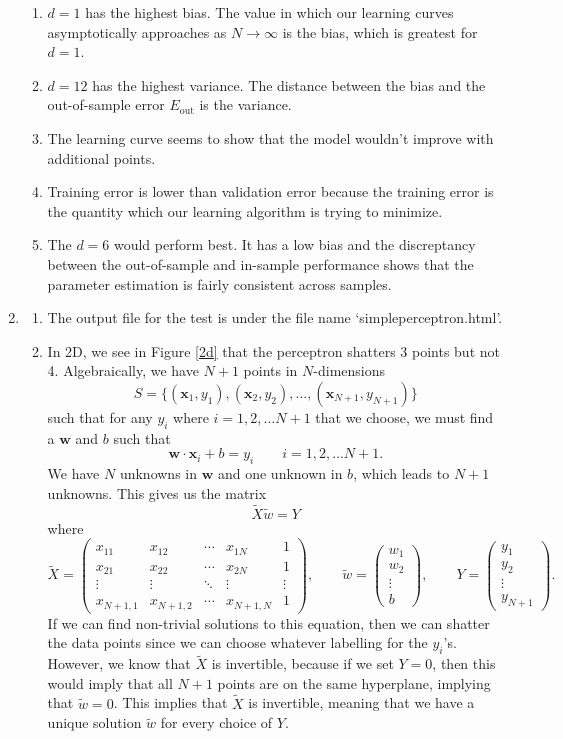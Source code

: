 \documentclass[12pt]{article}
\newcommand{\Eout}{E_{\text{out}}}
\newcommand{\x}{\mathbf x}
\begin{document}
\begin{enumerate}[leftmargin=*]
\begin{enumerate}[label = \Alph*.]
\item $d = 1$ has the highest bias. The value in which our learning curves asymptotically approaches as $N \to \infty$ is the bias, which is greatest for $d = 1$.
\item $d = 12$ has the highest variance. The distance between the bias and the out-of-sample error $\Eout$ is the variance.
\item The learning curve seems to show that the model wouldn't improve with additional points.
\item Training error is lower than validation error because the training error is the quantity which our learning algorithm is trying to minimize.
\item The $d = 6$ would perform best. It has a low bias and the discreptancy between the out-of-sample and in-sample performance shows that the parameter estimation is fairly consistent across samples.
\end{enumerate}
\item
\begin{enumerate}[label = \Alph*.]
\item The output file for the test is under the file name `simpleperceptron.html'.
\item In 2D, we see in Figure \ref{2d} that the perceptron shatters 3 points but not 4. Algebraically, we have $N + 1$ points in $N$-dimensions
\[ S = \{(\x_1, y_1), (\x_2, y_2), \ldots, (\x_{N+1}, y_{N+1})\} \]
such that for any $y_i$ where $i = 1, 2, \ldots N + 1$ that we choose, we must find a $\mathbf w$ and $b$ such that
\[ \mathbf w \cdot \x_i + b = y_i \qquad i = 1, 2, \ldots N+1. \]
We have $N$ unknowns in $\mathbf w$ and one unknown in $b$, which leads to $N + 1$ unknowns. This gives us the matrix
\[ \tilde X \tilde w = Y \]
where
\[ \tilde X = \begin{pmatrix} x_{11} & x_{12} & \cdots & x_{1N} & 1 \\ x_{21} & x_{22} & \cdots & x_{2N} & 1 \\ \vdots & \vdots & \ddots & \vdots & \vdots \\ x_{N+1, 1} & x_{N + 1, 2} & \cdots & x_{N + 1, N} & 1 \end{pmatrix}, \qquad \tilde w = \begin{pmatrix} w_1 \\ w_2 \\ \vdots \\ b \end{pmatrix}, \qquad Y = \begin{pmatrix} y_1 \\ y_2 \\ \vdots \\ y_{N +1} \end{pmatrix}. \]
If we can find non-trivial solutions to this equation, then we can shatter the data points since we can choose whatever labelling for the $y_i$'s. However, we know that $\tilde X$ is invertible, because if we set $Y = 0$, then this would imply that all $N + 1$ points are on the same hyperplane, implying that $\tilde w = 0$. This implies that $\tilde X$ is invertible, meaning that we have a unique solution $\tilde w$ for every choice of $Y$.


\end{enumerate}
\end{enumerate}
\end{document}

